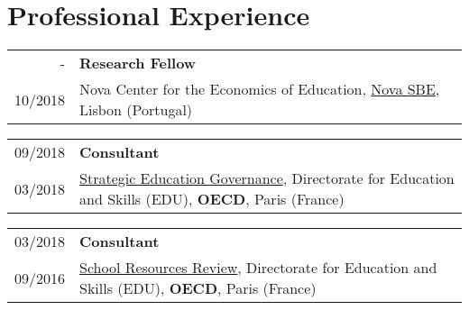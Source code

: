 \documentclass[a4paper,11pt]{article} %
\begin{document}
\section[Professional Experience]{\faBriefcase \hspace{3pt} Professional Experience}

\begin{tabular}{r|p{13cm}}
			- & \textbf{Research Fellow} \\
		10/2018 & Nova Center for the Economics of Education, \href{https://www2.novasbe.unl.pt/en/}{Nova SBE}, Lisbon (Portugal) \\ 
	
	
\end{tabular}

\begin{tabular}{r|p{13cm}}
	09/2018 & \textbf{Consultant} \\
	03/2018 & \href{http://www.oecd.org/education/ceri/strategic-education-governance.htm}{Strategic Education Governance}, Directorate for Education and Skills (EDU), \textbf{OECD}, Paris (France) \\ 

	
\end{tabular}

\begin{tabular}{r|p{13cm}}
	03/2018 & \textbf{Consultant} \\
	09/2016 & \href{http://www.oecd.org/education/school-resources-review/}{School Resources Review}, Directorate for Education and Skills (EDU), \textbf{OECD}, Paris (France) \\ 

	
\end{tabular}
\end{document}
